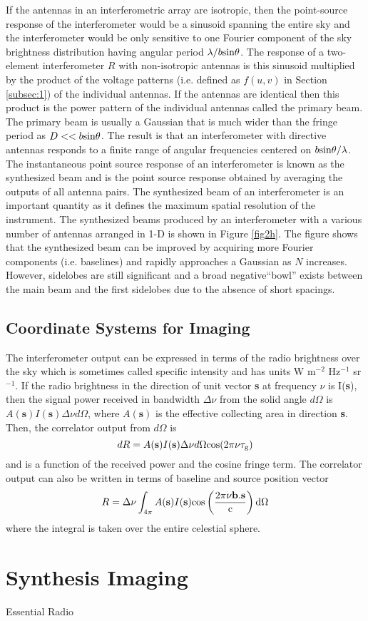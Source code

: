 If the antennas in an interferometric array are isotropic, then the  point-source response of the interferometer would be a sinusoid spanning the entire sky and the interferometer would be only sensitive to one Fourier component of the sky brightness distribution having angular period $\lambda/b\rm{sin}\theta$. The response of a two-element interferometer $R$ with non-isotropic antennas is this sinusoid multiplied by the product of the voltage patterns (i.e. defined as $f(u,v)$ in Section \ref{subsec:1}) of the individual antennas. If the antennas are identical then this product is the power pattern of the individual antennas called the primary beam. The primary beam is usually a Gaussian that is much wider than the fringe period as $D << b\rm{sin}\theta$. The result is that an interferometer with directive antennas responds to a finite range of angular frequencies centered on $b\rm{sin}\theta /\lambda$. The instantaneous point source response of an interferometer is known as the synthesized beam and is the point source response obtained by averaging the outputs of all antenna pairs. The synthesized beam of an interferometer is an important quantity as it defines the maximum spatial resolution of the instrument. The synthesized beams produced by an interferometer with a various number of antennas arranged in 1-D is shown in Figure \ref{fig2h}. The figure shows that the synthesized beam can be improved by acquiring more Fourier components (i.e. baselines) and rapidly approaches a Gaussian as $N$ increases. However, sidelobes are still significant and a broad negative``bowl'' exists between the main beam and the first sidelobes due to the absence of short spacings.

\subsection{Coordinate Systems for Imaging}\label{subsec:6}
The interferometer output can be expressed in terms of the radio brightness over the sky which is sometimes called specific intensity and has units W m$^{-2}$ Hz$^{-1}$ sr$^{-1}$. If the radio brightness in the direction of unit vector \textbf{s} at frequency $\nu$ is I(\textbf{s}), then the signal power received in bandwidth $\Delta \nu$ from the solid angle $d\Omega$ is $A(\textbf{s})I(\textbf{s})\Delta \nu d\Omega$, where $A(\textbf{s})$ is the effective collecting area in direction \textbf{s}. Then, the correlator output from  $d\Omega$ is
\begin{equation}
dR=A(\textbf{s})I(\textbf{s})\Delta \nu d\Omega \rm{cos}(2\pi \nu \tau _{\rm{g}})
\end{equation}
and is a function of the received power and the cosine fringe term. The correlator output can also be written in terms of baseline and source position vector
\begin{equation}
R=\Delta \nu \int _{4\pi}A(\textbf{s})I(\textbf{s}) \rm{cos}\left(\frac{2\pi \nu \textbf{b}.\textbf{s}}{c} \right)d\Omega
\end{equation}
where the integral is taken over the entire celestial sphere. 
\section{Synthesis Imaging}\label{sec:4}
Essential Radio 